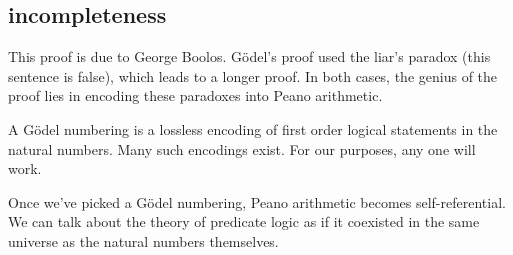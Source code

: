 \documentclass{scrbook}
\begin{document}
\subsection{incompleteness} 
This proof is due to George Boolos. Gödel's proof used the liar's paradox (this sentence is false), which leads to a longer proof.\cite{wiki:incomplete-sketch} In both cases, the genius of the proof lies in encoding these paradoxes into Peano arithmetic. 

\begin{defn}
  A Gödel numbering is a lossless encoding of first order logical statements in the natural numbers. Many such encodings exist. For our purposes, any one will work. 
\end{defn}
Once we've picked a Gödel numbering, Peano arithmetic becomes self-referential.  We can talk about the theory of predicate logic as if it coexisted in the same universe as the natural numbers themselves. 
\end{document}
